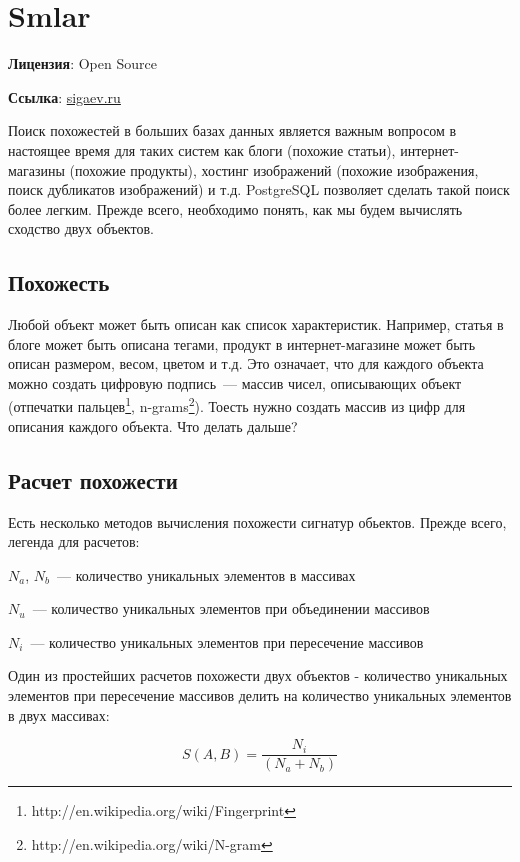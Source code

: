 \section{Smlar}
\textbf{Лицензия}: Open Source

\textbf{Ссылка}: \href{http://sigaev.ru/git/gitweb.cgi?p=smlar.git;a=blob;hb=HEAD;f=README}{sigaev.ru}

Поиск похожестей в больших базах данных является важным вопросом в настоящее время для таких систем как блоги (похожие статьи), интернет-магазины (похожие продукты), хостинг изображений (похожие изображения, поиск дубликатов изображений) и т.д. PostgreSQL позволяет сделать такой поиск более легким. Прежде всего, необходимо понять, как мы будем вычислять сходство двух объектов.

\subsection{Похожесть}

Любой объект может быть описан как список характеристик. Например, статья в блоге может быть описана тегами, продукт в интернет-магазине может быть описан размером, весом, цветом и т.д. Это означает, что для каждого объекта можно создать цифровую подпись~--- массив чисел, описывающих объект (отпечатки пальцев\footnote{http://en.wikipedia.org/wiki/Fingerprint}, n-grams\footnote{http://en.wikipedia.org/wiki/N-gram}). Тоесть нужно создать массив из цифр для описания каждого объекта. Что делать дальше?

\subsection{Расчет похожести}

Есть несколько методов вычисления похожести сигнатур обьектов. Прежде всего, легенда для расчетов:

$N_a$, $N_b$~--- количество уникальных элементов в массивах

$N_u$~--- количество уникальных элементов при объединении массивов

$N_i$~--- количество уникальных элементов при пересечение массивов

Один из простейших расчетов похожести двух объектов - количество уникальных элементов при пересечение массивов делить на количество уникальных элементов в двух массивах:

\begin{equation}
 \label{eq:smlar1}
 S(A,B) = \frac{N_{i}}{(N_{a}+N_{b})}
\end{equation}

